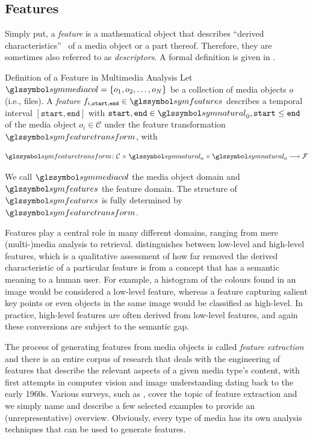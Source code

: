 \subsection{Features}
Simply put, a \emph{feature} is a mathematical object that describes ``derived characteristics''~\cite{Blanken:2007multimedia} of a media object or a part thereof. Therefore, they are sometimes also referred to as \emph{descriptors}. A formal definition is given in .

\begin{definition}[label=definition:feature]{Definition of a Feature in Multimedia Analysis}{}
    Let $\symmediacol = \lbrace o_1, o_2, \ldots, o_N \rbrace$ be a collection of media objects $o$ (i.e., files). A \emph{feature} $f_{i,\texttt{start},\texttt{end}} \in \symfeatures$ describes a temporal interval $[ \texttt{start}, \texttt{end} ]$ with $\texttt{start},\texttt{end} \in \symnatural_0, \texttt{start} \leq \texttt{end}$ of the media object $o_i \in \mathcal{C}$ under the feature transformation $\symfeaturetransform$, with 

    \begin{equation}
        \label{eq:feature_transformation}
        \symfeaturetransform \colon \mathcal{C} \times \symnatural_0 \times \symnatural_0 \longrightarrow \mathcal{F}
    \end{equation}

    We call $\symmediacol$ the media object domain and $\symfeatures$ the feature domain. The structure of  $\symfeatures$ is fully determined by $\symfeaturetransform$.
\end{definition}

Features play a central role in many different domains, ranging from mere (multi-)media analysis to retrieval. \cite{Blanken:2007multimedia} distinguishes between low-level and high-level features, which is a qualitative assessment of how far removed the derived characteristic of a particular feature is from a concept that has a semantic meaning to a human user. For example, a histogram of the colours found in an image would be considered a low-level feature, whereas a feature capturing salient key points or even objects in the same image would be classified as high-level. In practice, high-level features are often derived from low-level features, and again these conversions are subject to the semantic gap.

The process of generating features from media objects is called \emph{feature extraction} \cite{Blanken:2007multimedia} and there is an entire corpus of research that deals with the engineering of features that describe the relevant aspects of a given media type's content, with first attempts in computer vision and image understanding dating back to the early 1960s. Various surveys, such as \cite{McKinney:2003Features,Ding:2012ASurvey,Salau:2019Feature}, cover the topic of feature extraction and we simply name and describe a few selected examples to provide an (unrepresentative) overview. Obviously, every type of media has its own analysis techniques that can be used to generate features.

